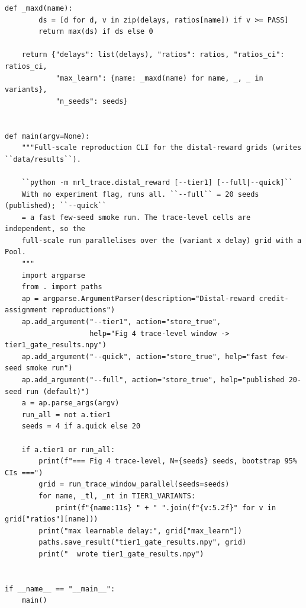 \begin{lstlisting}[caption={mrl\_trace/distal\_reward.py},label={lst:siox-src-distal_reward}]
    def _maxd(name):
        ds = [d for d, v in zip(delays, ratios[name]) if v >= PASS]
        return max(ds) if ds else 0

    return {"delays": list(delays), "ratios": ratios, "ratios_ci": ratios_ci,
            "max_learn": {name: _maxd(name) for name, _, _ in variants},
            "n_seeds": seeds}


def main(argv=None):
    """Full-scale reproduction CLI for the distal-reward grids (writes ``data/results``).

    ``python -m mrl_trace.distal_reward [--tier1] [--full|--quick]``
    With no experiment flag, runs all. ``--full`` = 20 seeds (published); ``--quick``
    = a fast few-seed smoke run. The trace-level cells are independent, so the
    full-scale run parallelises over the (variant x delay) grid with a Pool.
    """
    import argparse
    from . import paths
    ap = argparse.ArgumentParser(description="Distal-reward credit-assignment reproductions")
    ap.add_argument("--tier1", action="store_true",
                    help="Fig 4 trace-level window -> tier1_gate_results.npy")
    ap.add_argument("--quick", action="store_true", help="fast few-seed smoke run")
    ap.add_argument("--full", action="store_true", help="published 20-seed run (default)")
    a = ap.parse_args(argv)
    run_all = not a.tier1
    seeds = 4 if a.quick else 20

    if a.tier1 or run_all:
        print(f"=== Fig 4 trace-level, N={seeds} seeds, bootstrap 95% CIs ===")
        grid = run_trace_window_parallel(seeds=seeds)
        for name, _tl, _nt in TIER1_VARIANTS:
            print(f"{name:11s} " + " ".join(f"{v:5.2f}" for v in grid["ratios"][name]))
        print("max learnable delay:", grid["max_learn"])
        paths.save_result("tier1_gate_results.npy", grid)
        print("  wrote tier1_gate_results.npy")


if __name__ == "__main__":
    main()
\end{lstlisting}

